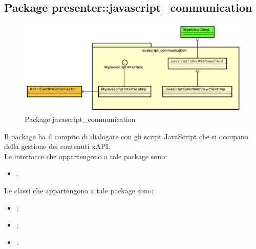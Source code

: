 \documentclass[../Tesi.tex]{subfiles}
\begin{document}
	\subsection{Package presenter::javascript\_communication}
		\begin{figure}[H]
			\centering
			\includegraphics[scale=0.5]{images/package_diagrams/javascript_communication}
				\caption{Package javascript\_communication}
		\end{figure}
		Il package  ha il compito di dialogare con gli script JavaScript che si occupano della gestione dei contenuti xAPI. \\
		Le interfacce che appartengono a tale package sono:
		\begin{itemize}
			\item {}.
		\end{itemize}
		Le classi che appartengono a tale package sono:
		\begin{itemize}
			\item {};
			\item {};
			\item {}.
		\end{itemize}
\end{document}
